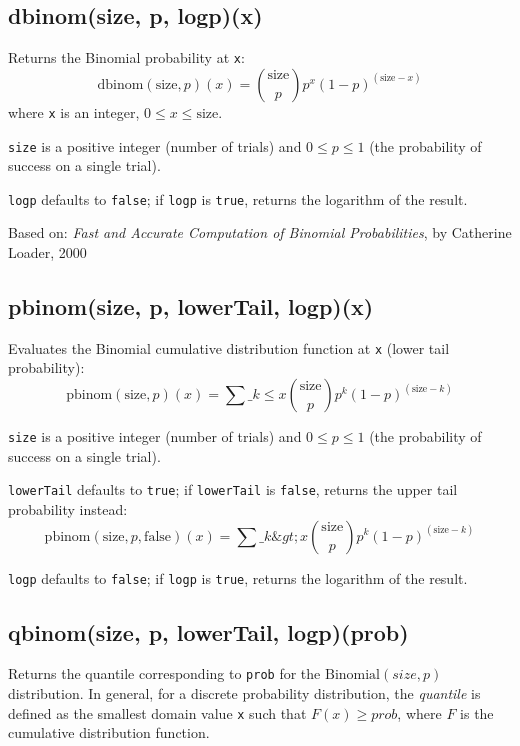 \documentclass{article}
\begin{document}
    \subsection*{dbinom(size, p, logp)(x)}
    Returns the Binomial probability at \texttt{x}:
$$\textrm{dbinom}(\textrm{size}, p)(x) = \binom{\textrm{size}}{p}p^{x}(1-p)^{(\textrm{size}-x)}$$
where \texttt{x} is an integer, $0 \leq x \leq \textrm{size}$.


\texttt{size} is a positive integer (number of trials) and $0 \leq p \leq 1$
(the probability of success on a single trial).


\texttt{logp} defaults to \texttt{false}; if \texttt{logp} is \texttt{true}, returns the
logarithm of the result.


Based on: \emph{Fast and Accurate Computation of Binomial Probabilities},
by Catherine Loader, 2000


    \subsection*{pbinom(size, p, lowerTail, logp)(x)}
    Evaluates the Binomial cumulative distribution
function at \texttt{x} (lower tail probability):
$$\textrm{pbinom}(\textrm{size}, p)(x) = \sum\_{k \leq x} \binom{\textrm{size}}{p}p^{k}(1-p)^{(\textrm{size}-k)}$$


\texttt{size} is a positive integer (number of trials) and $0 \leq p \leq 1$
(the probability of success on a single trial).


\texttt{lowerTail} defaults to \texttt{true}; if \texttt{lowerTail} is \texttt{false}, returns
the upper tail probability instead:
$$\textrm{pbinom}(\textrm{size}, p, \textrm{false})(x) = \sum\_{k\&gt;x} \binom{\textrm{size}}{p}p^{k}(1-p)^{(\textrm{size}-k)}$$


\texttt{logp} defaults to \texttt{false}; if \texttt{logp} is \texttt{true}, returns the logarithm
of the result.


    \subsection*{qbinom(size, p, lowerTail, logp)(prob)}
    Returns the quantile corresponding to \texttt{prob}
for the $\textrm{Binomial}(size, p)$ distribution.
In general, for a discrete probability
distribution, the \emph{quantile} is defined as the smallest domain value
\texttt{x} such that $F(x) \geq prob$, where $F$ is the cumulative
distribution function.
\end{document}
